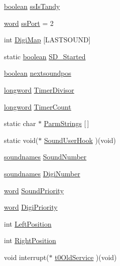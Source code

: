 \begin{DoxyCompactItemize}
\item 
\hyperlink{ID__HEAD_8H_a7c6368b321bd9acd0149b030bb8275ed}{boolean} \hyperlink{ID__SD_8C_a3a770af6d5ddb65c1530f9db23678f23}{ssIsTandy}
\item 
\hyperlink{ID__HEAD_8H_abad51e07ab6d26bec9f1f786c8d65bcd}{word} \hyperlink{ID__SD_8C_a87c9e242eb239995f5b8b3de055f9369}{ssPort} = 2
\item 
int \hyperlink{ID__SD_8C_a8eb2938805d7144c34e31598b0ad0263}{DigiMap} \mbox{[}LASTSOUND\mbox{]}
\item 
static \hyperlink{ID__HEAD_8H_a7c6368b321bd9acd0149b030bb8275ed}{boolean} \hyperlink{ID__SD_8C_aaa7e60c2848c9a99f53b8e3d0d8f3a04}{SD\_\-Started}
\item 
\hyperlink{ID__HEAD_8H_a7c6368b321bd9acd0149b030bb8275ed}{boolean} \hyperlink{ID__SD_8C_ab34ef4c36d091dd63f5b4c3046d16404}{nextsoundpos}
\item 
\hyperlink{ID__HEAD_8H_a8a9a7dd50c6fdb45dcdf0eb929479663}{longword} \hyperlink{ID__SD_8C_a61983b653767fdf64ec0219001dc9d6f}{TimerDivisor}
\item 
\hyperlink{ID__HEAD_8H_a8a9a7dd50c6fdb45dcdf0eb929479663}{longword} \hyperlink{ID__SD_8C_ac0891f4aad59f67cc6167b142d6d0765}{TimerCount}
\item 
static char $\ast$ \hyperlink{ID__SD_8C_af8599e1c1fbb3afabbdaa22e7c4a94b0}{ParmStrings} \mbox{[}$\,$\mbox{]}
\item 
static void($\ast$ \hyperlink{ID__SD_8C_a15f5e9cb1ffb19981c28948df6691373}{SoundUserHook} )(void)
\item 
\hyperlink{AUDIOSDM_8H_a4a3d02bfe7b02201dbba1993b77ae7e1}{soundnames} \hyperlink{ID__SD_8C_a4c4aa04b74e9aeb63645d0b371d03f8e}{SoundNumber}
\item 
\hyperlink{AUDIOSDM_8H_a4a3d02bfe7b02201dbba1993b77ae7e1}{soundnames} \hyperlink{ID__SD_8C_a60d58a884f1194a15c4312ca07eeb4e7}{DigiNumber}
\item 
\hyperlink{ID__HEAD_8H_abad51e07ab6d26bec9f1f786c8d65bcd}{word} \hyperlink{ID__SD_8C_a1082f4d01ae4202540aa8c9d40ab1208}{SoundPriority}
\item 
\hyperlink{ID__HEAD_8H_abad51e07ab6d26bec9f1f786c8d65bcd}{word} \hyperlink{ID__SD_8C_aa96b82bb4353f27d3198a6b79f08c677}{DigiPriority}
\item 
int \hyperlink{ID__SD_8C_aa6675177fdb4fdde5519bc5ed2de9d0a}{LeftPosition}
\item 
int \hyperlink{ID__SD_8C_add1e77eb812023bd620943a5d6e2d560}{RightPosition}
\item 
void interrupt($\ast$ \hyperlink{ID__SD_8C_a953f0c1cacd2d74a3d7c68f2fbec7291}{t0OldService} )(void)

\end{DoxyCompactItemize}
